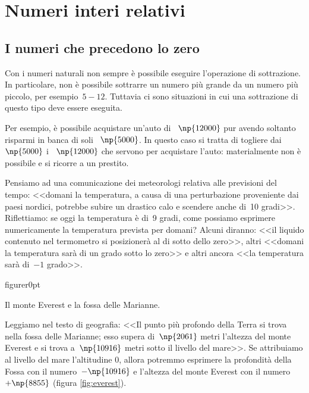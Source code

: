 \chapter{Numeri interi relativi}
\section{I numeri che precedono lo zero}

Con i numeri naturali non sempre è possibile eseguire l'operazione di sottrazione. In particolare,
non è possibile sottrarre un numero più grande da un numero più piccolo, per esempio~$5-12$. Tuttavia
ci sono situazioni in cui una sottrazione di questo tipo deve essere eseguita.

Per esempio, è possibile acquistare un'auto di \officialeuro~$\np{12000}$ pur avendo soltanto risparmi in banca di soli
\officialeuro~$\np{5000}$. In questo caso si tratta di togliere dai \officialeuro~$\np{5000}$ i \officialeuro~$\np{12000}$ che servono per acquistare
l'auto: materialmente non è possibile e si ricorre a un prestito.

Pensiamo ad una comunicazione dei meteorologi relativa alle previsioni del tempo: <<domani la temperatura,
a causa di una perturbazione proveniente dai paesi nordici, potrebbe subire un drastico calo e scendere anche di~10 gradi>>. Riflettiamo: se oggi la temperatura è di~9 gradi, come possiamo esprimere numericamente la temperatura
prevista per domani? Alcuni diranno: <<il liquido contenuto nel termometro si posizionerà al di sotto dello zero>>,
altri <<domani la temperatura sarà di un grado sotto lo zero>> e
altri ancora <<la temperatura sarà di~$-1$ grado>>.

\begin{wrapfloat}{figure}{r}{0pt}
 
 \caption{Il monte Everest e la fossa delle Marianne.}
 \label{fig:everest}
\end{wrapfloat}

Leggiamo nel testo di geografia: <<Il punto più profondo della Terra si trova nella fossa delle Marianne; esso
supera di~$\np{2061}$ metri l'altezza del monte Everest e si trova a~$\np{10916}$ metri sotto il livello del mare>>.
Se attribuiamo al livello del mare l'altitudine 0, allora potremmo esprimere la profondità della Fossa con il
numero~$-\np{10916}$ e l'altezza del monte Everest con il numero~$+\np{8855}$ (figura \ref{fig:everest}).

